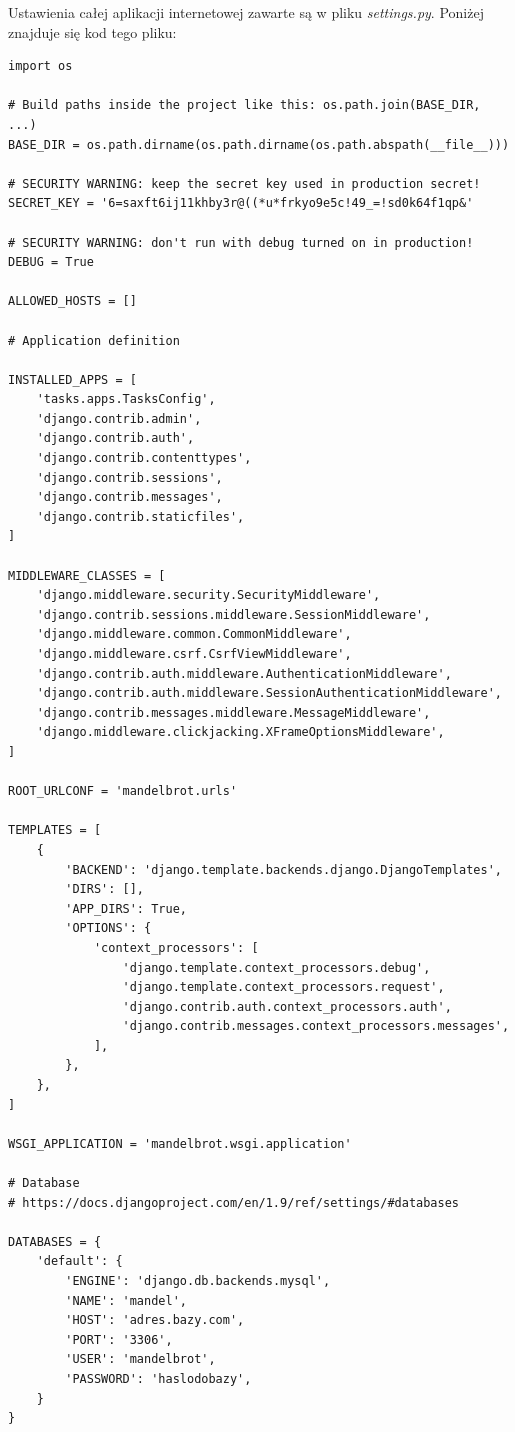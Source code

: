 \documentclass[a4paper]{article}
\begin{document}
Ustawienia całej aplikacji internetowej zawarte są w pliku \textit{settings.py}. Poniżej znajduje się kod tego pliku:
\begin{lstlisting}
import os

# Build paths inside the project like this: os.path.join(BASE_DIR, ...)
BASE_DIR = os.path.dirname(os.path.dirname(os.path.abspath(__file__)))

# SECURITY WARNING: keep the secret key used in production secret!
SECRET_KEY = '6=saxft6ij11khby3r@((*u*frkyo9e5c!49_=!sd0k64f1qp&'

# SECURITY WARNING: don't run with debug turned on in production!
DEBUG = True

ALLOWED_HOSTS = []

# Application definition

INSTALLED_APPS = [
    'tasks.apps.TasksConfig',
    'django.contrib.admin',
    'django.contrib.auth',
    'django.contrib.contenttypes',
    'django.contrib.sessions',
    'django.contrib.messages',
    'django.contrib.staticfiles',
]

MIDDLEWARE_CLASSES = [
    'django.middleware.security.SecurityMiddleware',
    'django.contrib.sessions.middleware.SessionMiddleware',
    'django.middleware.common.CommonMiddleware',
    'django.middleware.csrf.CsrfViewMiddleware',
    'django.contrib.auth.middleware.AuthenticationMiddleware',
    'django.contrib.auth.middleware.SessionAuthenticationMiddleware',
    'django.contrib.messages.middleware.MessageMiddleware',
    'django.middleware.clickjacking.XFrameOptionsMiddleware',
]

ROOT_URLCONF = 'mandelbrot.urls'

TEMPLATES = [
    {
        'BACKEND': 'django.template.backends.django.DjangoTemplates',
        'DIRS': [],
        'APP_DIRS': True,
        'OPTIONS': {
            'context_processors': [
                'django.template.context_processors.debug',
                'django.template.context_processors.request',
                'django.contrib.auth.context_processors.auth',
                'django.contrib.messages.context_processors.messages',
            ],
        },
    },
]

WSGI_APPLICATION = 'mandelbrot.wsgi.application'

# Database
# https://docs.djangoproject.com/en/1.9/ref/settings/#databases

DATABASES = {
    'default': {
        'ENGINE': 'django.db.backends.mysql',
        'NAME': 'mandel',
        'HOST': 'adres.bazy.com',
        'PORT': '3306',
        'USER': 'mandelbrot',
        'PASSWORD': 'haslodobazy',
    }
}


\end{lstlisting}
\end{document}
